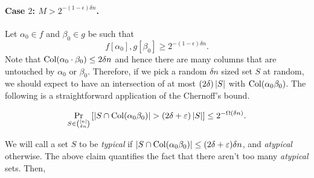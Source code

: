 \paragraph{Case $2$: $M > 2^{-(1-\epsilon) \delta n}$.} Let $\alpha_0 \in f$ and $\beta_0\in g$ be such that
\[
f[\alpha_0], g[\beta_0] \geq 2^{-(1-\epsilon) \delta n}.
\]
Note that $\operatorname{Col}(\alpha_0 \cdot \beta_0) \leq 2\delta n$ and hence there are many columns that are untouched by $\alpha_0$ or $\beta_0$. Therefore, if we pick a random $\delta n$ sized set $S$ at random, we should expect to have an  intersection of at most $(2\delta)\left|S\right|$ with $\operatorname{Col}(\alpha_0 \beta_0)$. The following is a straightforward application of the Chernoff's bound.
\begin{claim}
  \[
    \Pr_{S \in \binom{[n]}{\delta n}}\left[\left|S \cap \operatorname{Col}(\alpha_0 \beta_0)\right| > (2\delta + \varepsilon)\left|S\right| \right] \leq 2^{-\Omega(\delta n)}.
  \]
\end{claim}
We will call a set $S$ to be \emph{typical} if $\left|S \cap \operatorname{Col}(\alpha_0 \beta_0)\right| \leq (2\delta + \varepsilon)\delta n$, and \emph{atypical} otherwise. The above claim quantifies the fact that there aren't too many \emph{atypical} sets. Then,
